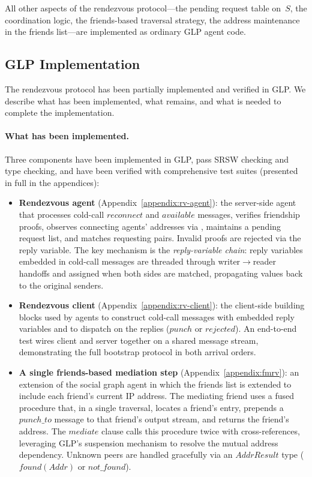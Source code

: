 All other aspects of the rendezvous protocol---the pending request table on~$S$, the coordination logic, the friends-based traversal strategy, the address maintenance in the friends list---are implemented as ordinary GLP agent code.

\subsection{GLP Implementation}
\label{sec:rv-glp-impl}
The rendezvous protocol has been partially implemented and verified in GLP.  We describe what has been implemented, what remains, and what is needed to complete the implementation.

\paragraph{What has been implemented.}
Three components have been implemented in GLP, pass SRSW checking and type checking, and have been verified with comprehensive test suites (presented in full in the appendices):
\begin{itemize}
\item \textbf{Rendezvous agent} (Appendix~\ref{appendix:rv-agent}): the server-side agent that processes cold-call $\mathit{reconnect}$ and $\mathit{available}$ messages, verifies friendship proofs, observes connecting agents' addresses via , maintains a pending request list, and matches requesting pairs.  Invalid proofs are rejected via the reply variable.  The key mechanism is the \emph{reply-variable chain}: reply variables embedded in cold-call messages are threaded through writer$\to$reader handoffs and assigned when both sides are matched, propagating values back to the original senders.

\item \textbf{Rendezvous client} (Appendix~\ref{appendix:rv-client}): the client-side building blocks used by agents to construct cold-call messages with embedded reply variables and to dispatch on the replies ($\mathit{punch}$ or $\mathit{rejected}$).  An end-to-end test wires client and server together on a shared message stream, demonstrating the full bootstrap protocol in both arrival orders.

\item \textbf{A single friends-based mediation step} (Appendix~\ref{appendix:fmrv}): an extension of the social graph agent in which the friends list is extended to include each friend's current IP address.  The mediating friend uses a fused  procedure that, in a single traversal, locates a friend's entry, prepends a $\mathit{punch\_to}$ message to that friend's output stream, and returns the friend's address.  The $\mathit{mediate}$ clause calls this procedure twice with cross-references, leveraging GLP's suspension mechanism to resolve the mutual address dependency.  Unknown peers are handled gracefully via an $\mathit{AddrResult}$ type ($\mathit{found}(\mathit{Addr})$ or $\mathit{not\_found}$).
\end{itemize}

